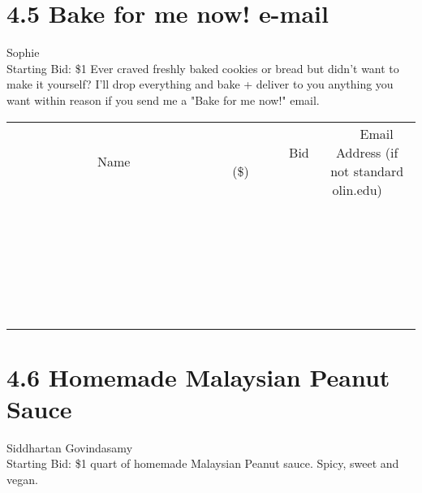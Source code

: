 \documentclass[11pt]{article}
\begin{document}
\section*{4.5 Bake for me now! e-mail}
Sophie
\\
Starting Bid: \$1
\newline
Ever craved freshly baked cookies or bread but didn't want to make it yourself? I'll drop everything and bake + deliver to you anything you want within reason if you send me a "Bake for me now!" email.
\\[6ex]
\begin{tabular}{c c c}
~~~~~~~~~~~~~Name~~~~~~~~~~~~~ & ~~~~~~~~~Bid (\$)~~~~~~~~~  & ~~~Email Address (if not standard olin.edu)~~~\\
 & & \\
\hline
 & & \\
\hline
 & & \\
\hline
 & & \\
\hline
 & & \\
\hline
 & & \\
\hline
 & & \\
\hline
 & & \\
\hline
 & & \\
\hline
 & & \\
\hline
 & & \\
\hline
 & & \\
\hline
 & & \\
\hline
 & & \\
\hline
 & & \\
\hline
 & & \\
\hline
 & & \\
\hline
 & & \\
\hline
 & & \\
\hline
 & & \\
\hline
 & & \\
\hline
 & & \\
\hline
 & & \\
\hline
 & & \\
\hline
 & & \\
\hline
 & & \\
\hline
\end{tabular}
\newpage
\section*{4.6 Homemade Malaysian Peanut Sauce}
Siddhartan Govindasamy
\\
Starting Bid: \$1
 quart of homemade Malaysian Peanut sauce. Spicy, sweet and vegan.
\end{document}
